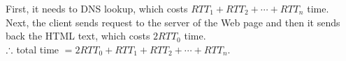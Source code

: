 \begin{pr}
First, it needs to DNS lookup, which costs $RTT_1+RTT_2+\cdots+RTT_n$ time.\\
Next, the client sends request to the server of the Web page and then it sends back the HTML text, which costs $2RTT_0$ time.\\
$\therefore$ total time $=2RTT_0+RTT_1+RTT_2+\cdots+RTT_n$.
\end{pr}
